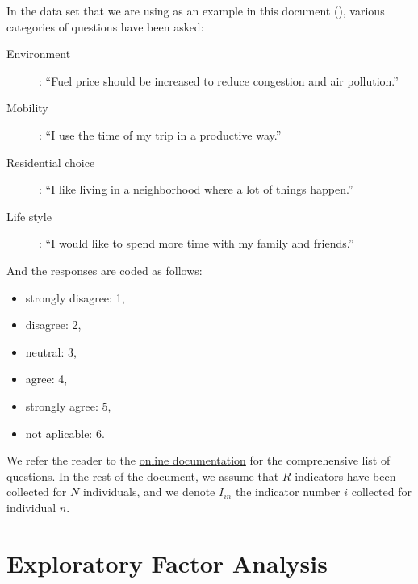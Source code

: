 \documentclass[12pt,a4paper]{article}
\begin{document}
In the data set that we are using as an example in this document (\cite{OptimaRP2011}), various categories of questions have been asked:
\begin{description}
\item[Environment]: ``Fuel price should be increased to reduce congestion and air pollution.''
\item[Mobility]: ``I use the time of my trip in a productive way.''
\item[Residential choice]: ``I like living in a neighborhood where a lot of things happen.''
  \item[Life style]: ``I would like to spend more time with my family and friends.''
\end{description}
And the responses are coded as follows:
\begin{itemize}
\item strongly disagree: 1,
\item disagree: 2,
\item neutral: 3,
\item agree: 4,
\item strongly agree: 5,
\item not aplicable: 6.
\end{itemize}

We refer the reader to the
\href{https://transp-or.epfl.ch/documents/technicalReports/CS_OptimaDescription.pdf}{online
  documentation} for the comprehensive list of questions. In the rest
of the document, we assume that $R$ indicators have been collected for
$N$ individuals, and we denote $I_{in}$ the indicator number $i$
collected for individual $n$.


\section{Exploratory Factor Analysis}
\end{document}
